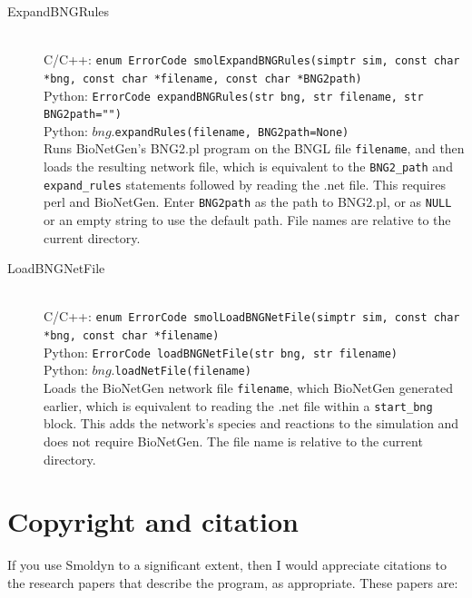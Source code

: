 \documentclass {scrbook}
\newcommand {\ttt} {\texttt}
\begin{document}
\begin{description}
\item[ExpandBNGRules]
\hfill \\
C/C++: \ttt{enum ErrorCode smolExpandBNGRules(simptr sim, const char *bng, const char *filename, const char *BNG2path)}\\
Python: \ttt{ErrorCode expandBNGRules(str bng, str filename, str BNG2path="")}\\
Python: $bng$.\ttt{expandRules(filename, BNG2path=None)}\\
Runs BioNetGen's BNG2.pl program on the BNGL file \ttt{filename}, and then loads the resulting network file, which is equivalent to the \ttt{BNG2\_path} and \ttt{expand\_rules} statements followed by reading the .net file. This requires perl and BioNetGen. Enter \ttt{BNG2path} as the path to BNG2.pl, or as \ttt{NULL} or an empty string to use the default path. File names are relative to the current directory.

\item[LoadBNGNetFile]
\hfill \\
C/C++: \ttt{enum ErrorCode smolLoadBNGNetFile(simptr sim, const char *bng, const char *filename)}\\
Python: \ttt{ErrorCode loadBNGNetFile(str bng, str filename)}\\
Python: $bng$.\ttt{loadNetFile(filename)}\\
Loads the BioNetGen network file \ttt{filename}, which BioNetGen generated earlier, which is equivalent to reading the .net file within a \ttt{start\_bng} block. This adds the network's species and reactions to the simulation and does not require BioNetGen. The file name is relative to the current directory.

\end{description}


\chapter{Copyright and citation}

If you use Smoldyn to a significant extent, then I would appreciate citations to the research papers that describe the program, as appropriate. These papers are:
\end{document}
